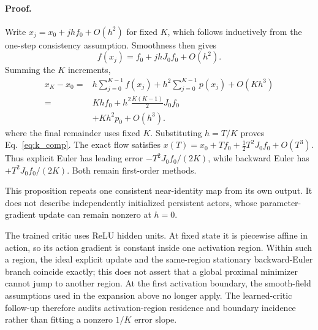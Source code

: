 \documentclass[twoside]{article}
\begin{document}
\paragraph{Proof.}
Write $x_j=x_0+jhf_0+O(h^2)$ for fixed $K$, which follows inductively from the
one-step consistency assumption. Smoothness then gives
\begin{equation}
f(x_j)=f_0+jhJ_0f_0+O(h^2).
\end{equation}
Summing the $K$ increments,
\begin{equation}
\begin{aligned}
x_K-x_0
={}&h\sum_{j=0}^{K-1}f(x_j)
+h^2\sum_{j=0}^{K-1}p(x_j)+O(Kh^3)\\
={}&Khf_0+h^2\frac{K(K-1)}{2}J_0f_0\\
&+Kh^2p_0+O(h^3).
\end{aligned}
\end{equation}
where the final remainder uses fixed $K$. Substituting $h=T/K$ proves
Eq.~\eqref{eq:k_comp}. The exact flow satisfies
$x(T)=x_0+Tf_0+\tfrac12T^2J_0f_0+O(T^3)$. Thus explicit Euler has leading
error $-T^2J_0f_0/(2K)$, while backward Euler has
$+T^2J_0f_0/(2K)$. Both remain first-order methods.

This proposition repeats one consistent near-identity map from its own output.
It does not describe independently initialized persistent actors, whose
parameter-gradient update can remain nonzero at $h=0$.

The trained critic uses ReLU hidden units. At fixed state it is piecewise
affine in action, so its action gradient is constant inside one activation
region. Within such a region, the ideal explicit update and the same-region
stationary backward-Euler branch coincide exactly; this does not assert that a
global proximal minimizer cannot jump to another region. At the first
activation boundary, the smooth-field assumptions used in the expansion above
no longer apply. The learned-critic
follow-up therefore audits activation-region residence and boundary incidence
rather than fitting a nonzero $1/K$ error slope.
\end{document}
